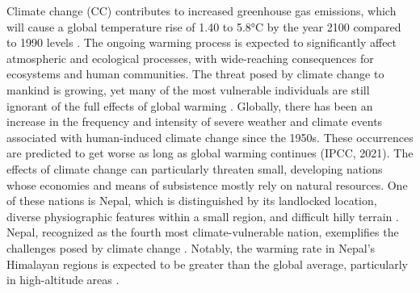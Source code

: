 Climate change (CC) contributes to increased greenhouse gas emissions, which will cause a global temperature rise of 1.40 to 5.8°C by the year 2100 compared to 1990 levels \citep{mccarthy_climate_2001}. The ongoing warming process is expected to significantly affect atmospheric and ecological processes, with wide-reaching consequences for ecosystems and human communities. The threat posed by climate change to mankind is growing, yet many of the most vulnerable individuals are still ignorant of the full effects of global warming \citep{maharjan_tharu_nodate}. Globally, there has been an increase in the frequency and intensity of severe weather and climate events associated with human-induced climate change since the 1950s. These occurrences are predicted to get worse as long as global warming continues \citep{intergovernmental_panel_on_climate_change_ipcc_climate_2023} (IPCC, 2021).
The effects of climate change can particularly threaten small, developing nations whose economies and means of subsistence mostly rely on natural resources. One of these nations is Nepal, which is distinguished by its landlocked location, diverse physiographic features within a small region, and difficult hilly terrain \citep{shrestha_climate_2011}. Nepal, recognized as the fourth most climate-vulnerable nation, exemplifies the challenges posed by climate change \citep{manandhar_adapting_2011,reilly_climate_in_usa}. Notably, the warming rate in Nepal's Himalayan regions is expected to be greater than the global average, particularly in high-altitude areas \citep{casestudy_bhattarai,yao_recent_2019,shrestha_maximum_1999}.


